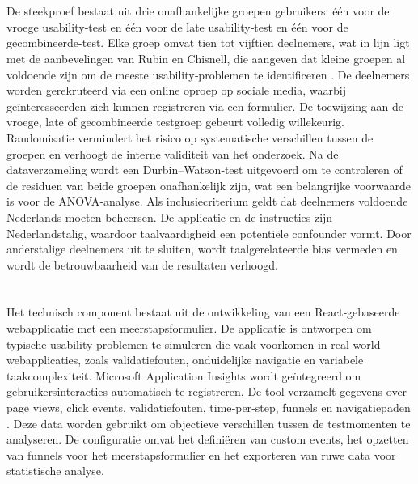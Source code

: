 \section{}
De steekproef bestaat uit drie onafhankelijke groepen gebruikers: één voor de vroege usability‑test en één voor de late usability‑test en één voor de gecombineerde-test. Elke groep omvat tien tot vijftien deelnemers, wat in lijn ligt met de aanbevelingen van Rubin en Chisnell, die aangeven dat kleine groepen al voldoende zijn om de meeste usability‑problemen te identificeren \autocite{RubinChisnell2008}. De deelnemers worden gerekruteerd via een online oproep op sociale media, waarbij geïnteresseerden zich kunnen registreren via een formulier.
De toewijzing aan de vroege, late of gecombineerde testgroep gebeurt volledig willekeurig. Randomisatie vermindert het risico op systematische verschillen tussen de groepen en verhoogt de interne validiteit van het onderzoek. Na de dataverzameling wordt een Durbin–Watson‑test uitgevoerd om te controleren of de residuen van beide groepen onafhankelijk zijn, wat een belangrijke voorwaarde is voor de ANOVA‑analyse.
Als inclusiecriterium geldt dat deelnemers voldoende Nederlands moeten beheersen. De applicatie en de instructies zijn Nederlandstalig, waardoor taalvaardigheid een potentiële confounder vormt. Door anderstalige deelnemers uit te sluiten, wordt taalgerelateerde bias vermeden en wordt de betrouwbaarheid van de resultaten verhoogd.


\section{}
Het technisch component bestaat uit de ontwikkeling van een React‑gebaseerde webapplicatie met een meerstapsformulier. De applicatie is ontworpen om typische usability‑problemen te simuleren die vaak voorkomen in real‑world webapplicaties, zoals validatiefouten, onduidelijke navigatie en variabele taakcomplexiteit.
Microsoft Application Insights wordt geïntegreerd om gebruikersinteracties automatisch te registreren. De tool verzamelt gegevens over page views, click events, validatiefouten, time‑per‑step, funnels en navigatiepaden \autocite{MicrosoftAI}. Deze data worden gebruikt om objectieve verschillen tussen de testmomenten te analyseren. De configuratie omvat het definiëren van custom events, het opzetten van funnels voor het meerstapsformulier en het exporteren van ruwe data voor statistische analyse.


